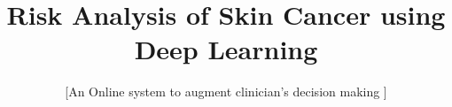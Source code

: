 \documentclass{sig-alternate-05-2015}
\begin{document}






%

\title{Risk Analysis of Skin Cancer using Deep Learning}
\subtitle{[An Online system to augment clinician's decision making ]
}
%
%
%
%
%
\end{document}

